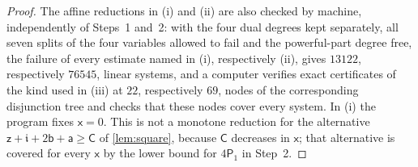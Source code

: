 \documentclass[11pt,colorlinks]{charlie}
\begin{document}
\begin{proof}
The affine reductions in (i) and (ii) are also checked by machine, independently of Steps~1 and~2: with the four dual degrees kept separately, all seven splits of the four variables allowed to fail and the powerful-part degree free, the failure of every estimate named in (i), respectively (ii), gives $13122$, respectively $76545$, linear systems, and a computer verifies exact certificates of the kind used in (iii) at $22$, respectively $69$, nodes of the corresponding disjunction tree and checks that these nodes cover every system. In (i) the program fixes $\mathsf x=0$. This is not a monotone reduction for the alternative $\mathsf z+\mathfrak i+2\mathsf b+\mathsf a\ge\mathsf C$ of \cref{lem:square}, because $\mathsf C$ decreases in $\mathsf x$; that alternative is covered for every $\mathsf x$ by the lower bound for $4\mathsf P_1$ in Step~2.


\end{proof}
\end{document}
